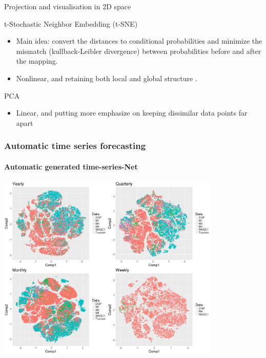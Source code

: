 \documentclass[10pt,aspectratio=43]{beamer}
\begin{document}
\begin{frame}{Projection and visualisation in 2D space}

  \begin{block}{t-Stochastic Neighbor Embedding (t-SNE)}

    \begin{itemize}
    \item
      Main idea: convert the distances to conditional probabilities and
      minimize the mismatch (kullback-Leibler divergence) between
      probabilities before and after the mapping.

    \item Nonlinear, and retaining both local and global structure
      \citep{maaten2008visualizing,van2014accelerating}.
    \end{itemize}

  \end{block}

  \begin{block}{PCA}

    \begin{itemize}
    \item
      Linear, and putting more emphasize on keeping dissimilar data points
      far apart
    \end{itemize}

  \end{block}

\end{frame}

\begin{frame}
    \frametitle{Automatic time series forecasting}
  \framesubtitle{Automatic generated time-series-Net}


  \centerline{\includegraphics[width=0.8\textwidth]{figures/coverage.png}}

\end{frame}
\end{document}
